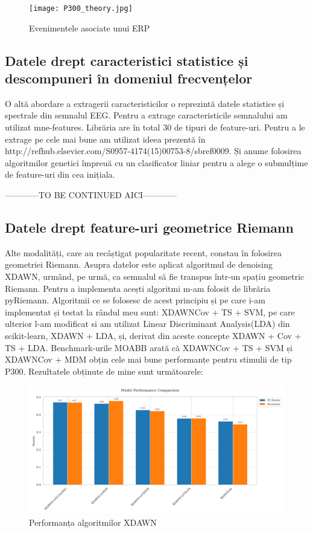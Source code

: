 \vspace{1em}
\begin{figure}[h]
    \centering
    \texttt{[image: P300\_theory.jpg]}
    \caption{Evenimentele asociate unui ERP\cite{P300_image}}
    \label{fig:enter-label}
\end{figure}


\subsection{Datele drept caracteristici statistice și descompuneri în domeniul frecvențelor}

O altă abordare a extragerii caracteristicilor o reprezintă datele statistice și spectrale din semnalul EEG. Pentru a extrage caracteristicile semnalului am utilizat mne-features\cite{mne-features}. Librăria are în total 30 de tipuri de feature-uri. Pentru a le extrage pe cele mai bune am utilizat ideea prezentă în http://refhub.elsevier.com/S0957-4174(15)00753-8/sbref0009. Și anume folosirea algoritmilor genetici împreuă cu un clasificator liniar pentru a alege o submulțime de feature-uri din cea inițiala.

------------TO BE CONTINUED AICI------------

\subsection{Datele drept feature-uri geometrice Riemann}
Alte modalități, care au recâștigat popularitate recent, constau în folosirea geometriei Riemann. Asupra datelor este aplicat algoritmul de denoising XDAWN\cite{xdawn}, urmând, pe urmă, ca semnalul să fie transpus într-un spațiu geometric Riemann. Pentru a implementa acești algoritmi m-am folosit de librăria pyRiemann\cite{pyriemann}. Algoritmii ce se folosesc de acest principiu și pe care i-am implementat și testat la rândul meu sunt: XDAWNCov + TS + SVM\cite{xdawncovtssvm}, pe care ulterior l-am modificat si am utilizat Linear Discriminant Analysis(LDA) din scikit-learn, XDAWN + LDA\cite{xdawnlda}, și, derivat din aceste concepte XDAWN + Cov + TS + LDA. Benchmark-urile MOABB\cite{moabb}  arată că XDAWNCov + TS + SVM și XDAWNCov + MDM obțin cele mai bune performanțe pentru stimulii de tip P300. Rezultatele obținute de mine sunt următoarele:

\vspace{1em}
\begin{figure}[h]
    \centering
    \includegraphics[width=1\linewidth]{comparison_xdawn.png}
    \caption{Performanța algoritmilor XDAWN}
    \label{fig:enter-label}
\end{figure}

